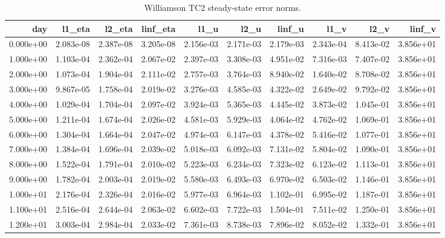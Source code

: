\begin{table}[htbp]
\centering
{}
\begin{tabular}{rrrrrrrrrr}
\toprule
day & l1\_eta & l2\_eta & linf\_eta & l1\_u & l2\_u & linf\_u & l1\_v & l2\_v & linf\_v \\
\midrule
0.000e+00 & 2.083e-08 & 2.387e-08 & 3.205e-08 & 2.156e-03 & 2.171e-03 & 2.179e-03 & 2.343e-04 & 8.413e-02 & 3.856e+01 \\
1.000e+00 & 1.103e-04 & 2.362e-04 & 2.067e-02 & 2.397e-03 & 3.308e-03 & 4.951e-02 & 7.316e-03 & 7.407e-02 & 3.856e+01 \\
2.000e+00 & 1.073e-04 & 1.904e-04 & 2.111e-02 & 2.757e-03 & 3.764e-03 & 8.940e-02 & 1.640e-02 & 8.708e-02 & 3.856e+01 \\
3.000e+00 & 9.867e-05 & 1.758e-04 & 2.019e-02 & 3.276e-03 & 4.585e-03 & 4.322e-02 & 2.649e-02 & 9.792e-02 & 3.856e+01 \\
4.000e+00 & 1.029e-04 & 1.704e-04 & 2.097e-02 & 3.924e-03 & 5.365e-03 & 4.445e-02 & 3.873e-02 & 1.045e-01 & 3.856e+01 \\
5.000e+00 & 1.211e-04 & 1.674e-04 & 2.026e-02 & 4.581e-03 & 5.929e-03 & 4.064e-02 & 4.762e-02 & 1.069e-01 & 3.856e+01 \\
6.000e+00 & 1.304e-04 & 1.664e-04 & 2.047e-02 & 4.974e-03 & 6.147e-03 & 4.378e-02 & 5.416e-02 & 1.077e-01 & 3.856e+01 \\
7.000e+00 & 1.384e-04 & 1.696e-04 & 2.039e-02 & 5.018e-03 & 6.092e-03 & 7.131e-02 & 5.804e-02 & 1.090e-01 & 3.856e+01 \\
8.000e+00 & 1.522e-04 & 1.791e-04 & 2.010e-02 & 5.223e-03 & 6.234e-03 & 7.323e-02 & 6.123e-02 & 1.113e-01 & 3.856e+01 \\
9.000e+00 & 1.782e-04 & 2.003e-04 & 2.019e-02 & 5.580e-03 & 6.493e-03 & 6.970e-02 & 6.503e-02 & 1.146e-01 & 3.856e+01 \\
1.000e+01 & 2.176e-04 & 2.326e-04 & 2.016e-02 & 5.977e-03 & 6.964e-03 & 1.102e-01 & 6.995e-02 & 1.187e-01 & 3.856e+01 \\
1.100e+01 & 2.516e-04 & 2.644e-04 & 2.063e-02 & 6.602e-03 & 7.722e-03 & 1.504e-01 & 7.511e-02 & 1.250e-01 & 3.856e+01 \\
1.200e+01 & 3.003e-04 & 2.984e-04 & 2.033e-02 & 7.361e-03 & 8.738e-03 & 7.896e-02 & 8.052e-02 & 1.332e-01 & 3.856e+01 \\
\bottomrule
\end{tabular}
\caption{Williamson TC2 steady-state error norms.}
\end{table}
